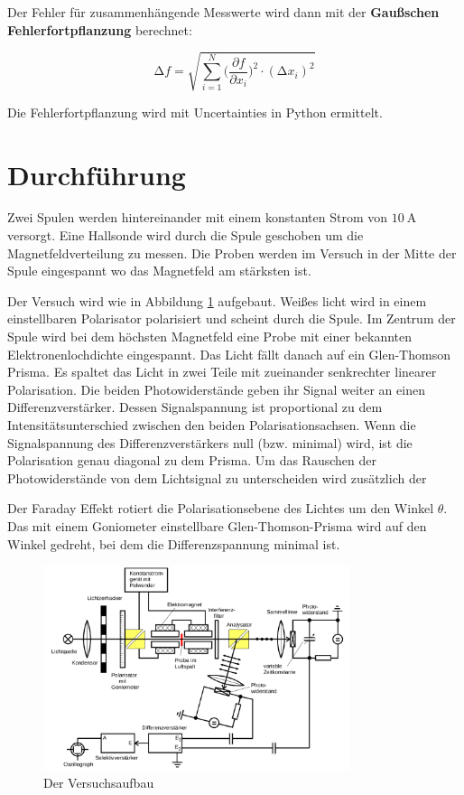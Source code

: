 Der Fehler für zusammenhängende Messwerte wird dann mit der \textbf{Gaußschen
	Fehlerfortpflanzung} berechnet:

\begin{equation}
	\increment{f} = \sqrt{ \sum_{i = 1}^{N}  \biggl(\frac{\partial{f}}{\partial{x_i}}\biggr)^2\cdot(\increment{x_i})^2}
	\label{eqn:Gauss}
\end{equation}

Die Fehlerfortpflanzung wird mit Uncertainties in Python \cite{uncertainties}
ermittelt.


\section{Durchführung\cite{man}}%
Zwei Spulen werden hintereinander mit einem konstanten Strom von
$\qty{10}{\ampere}$ versorgt. Eine Hallsonde wird durch die Spule geschoben um
die Magnetfeldverteilung zu messen. Die Proben werden im Versuch in der
Mitte der Spule eingespannt wo das Magnetfeld am stärksten ist.

Der Versuch wird wie in Abbildung \ref{fig:aufbau} aufgebaut. Weißes licht wird
in einem einstellbaren Polarisator polarisiert und scheint durch die Spule. Im
Zentrum der Spule wird bei dem höchsten Magnetfeld eine Probe mit einer
bekannten Elektronenlochdichte eingespannt. Das Licht fällt danach auf ein
Glen-Thomson Prisma. Es spaltet das Licht in zwei Teile mit zueinander
senkrechter linearer Polarisation. Die beiden Photowiderstände geben ihr Signal
weiter an einen Differenzverstärker. Dessen Signalspannung ist proportional zu
dem Intensitätsunterschied zwischen den beiden Polarisationsachsen. Wenn die
Signalspannung des Differenzverstärkers null (bzw. minimal) wird, ist die
Polarisation genau diagonal zu dem Prisma. Um das Rauschen der Photowiderstände
von dem Lichtsignal zu unterscheiden wird zusätzlich der %

Der Faraday Effekt rotiert die Polarisationsebene des Lichtes um den Winkel
$\theta$. Das mit einem Goniometer einstellbare Glen-Thomson-Prisma wird auf
den Winkel gedreht, bei dem die Differenzspannung minimal ist.

\begin{figure}
	\centering
	\includegraphics[width=0.8\textwidth]{./Bilder/aufbau.png}
	\caption{Der Versuchsaufbau \cite{man}}\label{fig:aufbau}
\end{figure}

